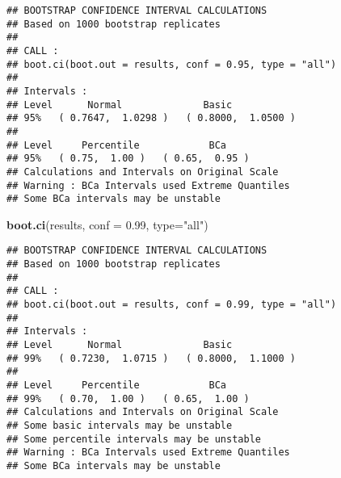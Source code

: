 \documentclass[]{article}
\newenvironment{Shaded}{\begin{snugshade}}{\end{snugshade}}
\newcommand{\KeywordTok}[1]{\textcolor[rgb]{0.13,0.29,0.53}{\textbf{#1}}}
\newcommand{\DataTypeTok}[1]{\textcolor[rgb]{0.13,0.29,0.53}{#1}}
\newcommand{\FloatTok}[1]{\textcolor[rgb]{0.00,0.00,0.81}{#1}}
\newcommand{\StringTok}[1]{\textcolor[rgb]{0.31,0.60,0.02}{#1}}
\newcommand{\OperatorTok}[1]{\textcolor[rgb]{0.81,0.36,0.00}{\textbf{#1}}}
\newcommand{\NormalTok}[1]{#1}
\begin{document}
\begin{verbatim}
## BOOTSTRAP CONFIDENCE INTERVAL CALCULATIONS
## Based on 1000 bootstrap replicates
## 
## CALL : 
## boot.ci(boot.out = results, conf = 0.95, type = "all")
## 
## Intervals : 
## Level      Normal              Basic         
## 95%   ( 0.7647,  1.0298 )   ( 0.8000,  1.0500 )  
## 
## Level     Percentile            BCa          
## 95%   ( 0.75,  1.00 )   ( 0.65,  0.95 )  
## Calculations and Intervals on Original Scale
## Warning : BCa Intervals used Extreme Quantiles
## Some BCa intervals may be unstable
\end{verbatim}

\begin{Shaded}
\begin{Highlighting}[]
\KeywordTok{boot.ci}\NormalTok{(results, }\DataTypeTok{conf =} \FloatTok{0.99}\NormalTok{, }\DataTypeTok{type=}\StringTok{"all"}\NormalTok{)}
\end{Highlighting}
\end{Shaded}

\begin{verbatim}
## BOOTSTRAP CONFIDENCE INTERVAL CALCULATIONS
## Based on 1000 bootstrap replicates
## 
## CALL : 
## boot.ci(boot.out = results, conf = 0.99, type = "all")
## 
## Intervals : 
## Level      Normal              Basic         
## 99%   ( 0.7230,  1.0715 )   ( 0.8000,  1.1000 )  
## 
## Level     Percentile            BCa          
## 99%   ( 0.70,  1.00 )   ( 0.65,  1.00 )  
## Calculations and Intervals on Original Scale
## Some basic intervals may be unstable
## Some percentile intervals may be unstable
## Warning : BCa Intervals used Extreme Quantiles
## Some BCa intervals may be unstable
\end{verbatim}

\begin{Shaded}
\end{Shaded}
\end{document}
